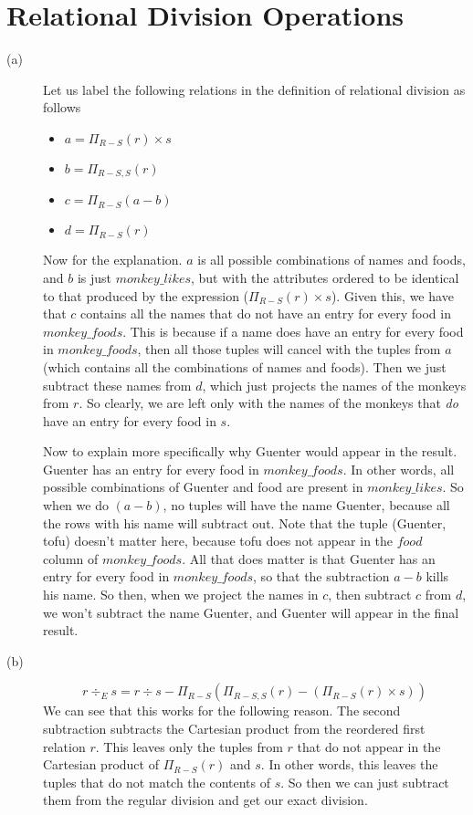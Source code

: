 \documentclass{article}
\begin{document}
\section*{Relational Division Operations}
\begin{description}
    \item[(a)]
        Let us label the following relations in the definition
        of relational division as follows
        \begin{itemize}
            \item $a = \Pi_{R-S}(r) \times s$
            \item $b = \Pi_{R-S, S}(r)$
            \item $c = \Pi_{R-S}(a - b)$
            \item $d = \Pi_{R-S}(r)$
        \end{itemize}

        Now for the explanation. $a$ is all possible combinations of names and
        foods, and $b$ is just $monkey\_likes$, but with the attributes ordered
        to be identical
        to that produced by the expression ($\Pi_{R-S}(r) \times s$). Given this,
        we have that $c$ contains all the names that do not have an entry for
        every food in $monkey\_foods$. This is because if a name does have an
        entry for every food in $monkey\_foods$,
        then all those tuples will cancel with the tuples from $a$
        (which contains all the combinations of names and foods). Then we just
        subtract these names from $d$, which just projects the names of the
        monkeys from $r$. So clearly, we are left only with the names of the
        monkeys that \textit{do} have an entry for every food in $s$.

        Now to explain more specifically why Guenter would appear in the result.
        Guenter has an entry for every food in $monkey\_foods$. In other words,
        all possible combinations of Guenter and food are present in
        $monkey\_likes$. So when we do $(a-b)$, no
        tuples will have the name Guenter, because all the rows with his name
        will subtract out. Note that the tuple (Guenter, tofu) doesn't matter
        here, because tofu does not appear in the $food$ column of $monkey\_foods$.
        All that does matter is that Guenter has an entry for every food in
        $monkey\_foods$, so that the subtraction $a-b$ kills his name.
        So then, when we project the names in $c$, then subtract
        $c$ from $d$, we won't subtract the name Guenter, and Guenter will appear
        in the final result.
    \item[(b)]
        \[ r \div _{E} s = r \div s - \Pi_{R-S}(\Pi_{R-S,S}(r) -
            (\Pi_{R-S}(r) \times s)) \]
        We can see that this works for the following reason.
        The second subtraction subtracts the Cartesian product from the reordered
        first relation $r$. This leaves only the tuples from $r$ that
        do not appear in the Cartesian product of $\Pi_{R-S}(r)$ and $s$.
        In other words, this leaves the tuples that do not match the contents
        of $s$. So then we can just subtract them from the regular division and
        get our exact division.


\end{description}
\end{document}
